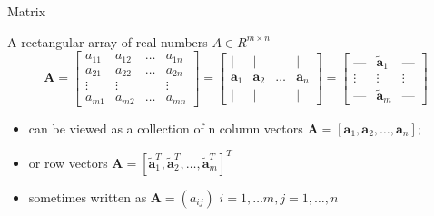 \documentclass[ignorenonframetext,]{beamer}
\providecommand{\tightlist}{%
  \setlength{\itemsep}{0pt}\setlength{\parskip}{0pt}}
\newcommand{\vv}[1]{\boldsymbol{#1}}
\begin{document}
\begin{frame}{Matrix}
\protect\hypertarget{matrix}{}

A rectangular array of real numbers \(A\in R^{m\times n}\)
\[\vv{A} = \begin{bmatrix}
a_{11} & a_{12} & \ldots & a_{1n}\\
a_{21} & a_{22} & \ldots & a_{2n} \\
\vdots & \vdots & & \vdots \\
a_{m1} & a_{m2} & \ldots & a_{mn}
\end{bmatrix}  = \begin{bmatrix}
\vert & \vert &  & \vert\\
\vv{a}_1 & \vv{a}_2 & \ldots & \vv{a}_{n} \\
\vert & \vert & & \vert 
\end{bmatrix} = \begin{bmatrix}
\text{---} & \vv{\tilde{a}}_1 & \text{---}\\
\vdots & \vdots & \vdots  \\
\text{---} & \vv{\tilde{a}}_m & \text{---}
\end{bmatrix} \]

\begin{itemize}
\tightlist
\item
  can be viewed as a collection of n column vectors
  \(\vv{A} = [\vv{a}_1, \vv{a}_2, \ldots, \vv{a}_n]\);
\item
  or row vectors
  \(\vv{A} = [\vv{\tilde{a}}_1^T, \vv{\tilde{a}}_2^T, \ldots, \vv{\tilde{a}}_m^T]^T\)
\item
  sometimes written as \(\vv{A} = (a_{ij})\)
  \(i= 1,\ldots m, j= 1,\ldots, n\)
\end{itemize}

\end{frame}
\end{document}
